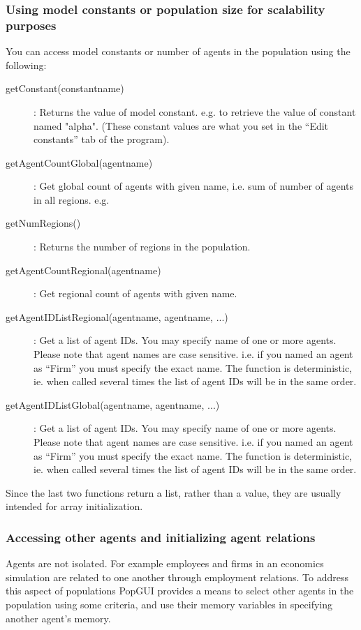 \documentclass{article}
\begin{document}
\subsubsection{Using model constants or population size for scalability purposes}
You can access model constants or number of agents in the population using the following:
\begin{description}
   \item[getConstant(constantname)]: Returns the value of model constant. e.g.  to retrieve the value of constant named "alpha". (These constant values are what you set in the ``Edit constants'' tab of the program).
   \item[getAgentCountGlobal(agentname)]: Get global count of agents with given name, i.e. sum of number of agents in all regions. e.g. 
   \item[getNumRegions()]: Returns the number of regions in the population.
   \item[getAgentCountRegional(agentname)]: Get regional count of agents with given name.
   \item[getAgentIDListRegional(agentname, agentname, ...)]: Get a list of agent IDs. You may specify name of one or more agents. Please note that agent names are case sensitive. i.e. if you named an agent as ``Firm'' you must specify the exact name. The function is deterministic, ie. when called several times the list of agent IDs will be in the same order.
   \item[getAgentIDListGlobal(agentname, agentname, ...)]: Get a list of agent IDs. You may specify name of one or more agents. Please note that agent names are case sensitive. i.e. if you named an agent as ``Firm'' you must specify the exact name.  The function is deterministic, ie. when called several times the list of agent IDs will be in the same order.
\end{description}
Since the last two functions return a list, rather than a value, they are usually intended for array initialization.

\subsubsection{Accessing other agents and initializing agent relations}
Agents are not isolated. For example employees and firms in an economics simulation are related to one another through employment relations. To address this aspect of populations PopGUI provides a means to select other agents in the population using some criteria, and use their memory variables in specifying another agent's memory.
\end{document}
